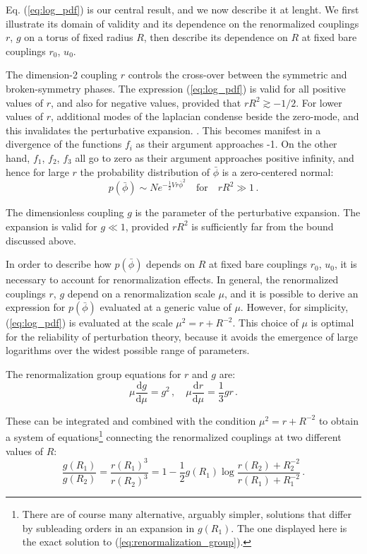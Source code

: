 \documentclass[11pt,a4paper]{article}
\newcommand{\dd}{\mathrm{d}}
\begin{document}
Eq. (\ref{eq:log_pdf}) is our central result, and we now describe it
at lenght. We first illustrate its domain of validity and its dependence on the
renormalized couplings $r$, $g$ on a torus of fixed radius $R$, then describe
its dependence on $R$ at fixed bare couplings $r_0$, $u_0$.

The dimension-2 coupling $r$ controls the cross-over between the symmetric and
broken-symmetry phases. The expression (\ref{eq:log_pdf}) is valid for
all positive values of $r$, and also for negative values, provided that $rR^2
\gtrsim -1/2$.  For lower values of $r$, additional modes of the laplacian
condense beside the zero-mode, and this invalidates the perturbative expansion.
. This becomes manifest in a divergence of the functions $f_i$ as their
argument approaches -1.  On the other hand, $f_1$, $f_2$, $f_3$ all go to zero
as their argument approaches positive infinity, and hence for large $r$ the
probability distribution of $\bar{\phi}$ is a zero-centered normal:
\begin{equation}
    p(\bar{\phi}) \sim N e^{- \frac{1}{2} V r \bar{\phi}^2}
  \quad \text{for} \quad
  rR^2 \gg 1\,.
\end{equation}

The dimensionless coupling $g$ is the parameter of the perturbative expansion.
The expansion is valid for $g \ll 1$, provided $rR^2$ is sufficiently far from
the bound discussed above.

In order to describe how $p(\bar{\phi})$ depends on $R$ at fixed bare couplings
$r_0$, $u_0$, it is necessary to account for renormalization effects. In
general, the renormalized couplings $r$, $g$ depend on a renormalization scale
$\mu$, and it is possible to derive an expression for $p(\bar{\phi})$ evaluated
at a generic value of $\mu$. However, for simplicity,
(\ref{eq:log_pdf}) is evaluated at the scale $\mu^2 = r + R^{-2}$.
This choice of $\mu$ is optimal for the reliability of perturbation theory,
because it avoids the emergence of large logarithms over the widest possible
range of parameters.

The renormalization group equations for $r$ and $g$ are:
\begin{equation}
  \label{eq:renormalization_group}
  \mu \frac{\dd g}{\dd \mu} = g^2\,,\quad
  \mu \frac{\dd r}{\dd \mu} = \frac{1}{3}g r\,.
\end{equation}

These can be integrated and combined with the condition $\mu^2 = r + R^{-2}$ to
obtain a system of equations\footnote{There are of course many alternative,
arguably simpler, solutions that differ by subleading orders in an expansion in
$g(R_1)$. The one displayed here is the exact solution to
(\ref{eq:renormalization_group}).} connecting the renormalized couplings at two
different values of $R$:
\begin{equation}
  \frac{g(R_1)}{g(R_2)} = \frac{r(R_1)^3}{r(R_2)^3} = 
  1 - \frac{1}{2} g(R_1)\log\frac{r(R_2) + R_2^{-2}}{r(R_1) + R_1^{-2}}\,.
\end{equation}
\end{document}
